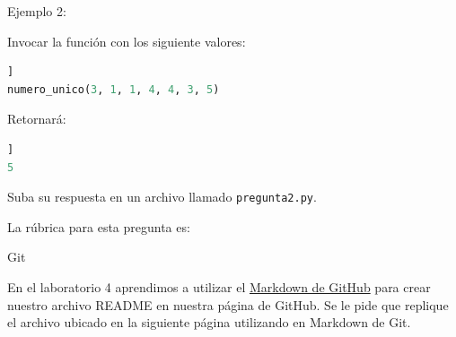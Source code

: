 \documentclass[12pt]{exam}
\begin{document}
\begin{questions}
Ejemplo 2:

Invocar la función con los siguiente valores:

\begin{lstlisting}[frame = single, language=python, caption=Ejemplo 2]]
numero_unico(3, 1, 1, 4, 4, 3, 5)
\end{lstlisting}
Retornará:
\begin{lstlisting}[frame = single, language=python, caption=Output 2]]
5
\end{lstlisting}

Suba su respuesta en un archivo llamado \lstinline{pregunta2.py}.



\newpage

La r\'ubrica para esta pregunta es:

\begin{table}[h]
\end{table}


\newpage

\question[5] Git

En el laboratorio 4 aprendimos a utilizar el \href{https://docs.github.com/en/github/writing-on-github/getting-started-with-writing-and-formatting-on-github/basic-writing-and-formatting-syntax}{Markdown de GitHub} para crear nuestro archivo README en nuestra página de GitHub. Se le pide que replique el archivo ubicado en la siguiente página utilizando en Markdown de Git.


\end{questions}
\end{document}
